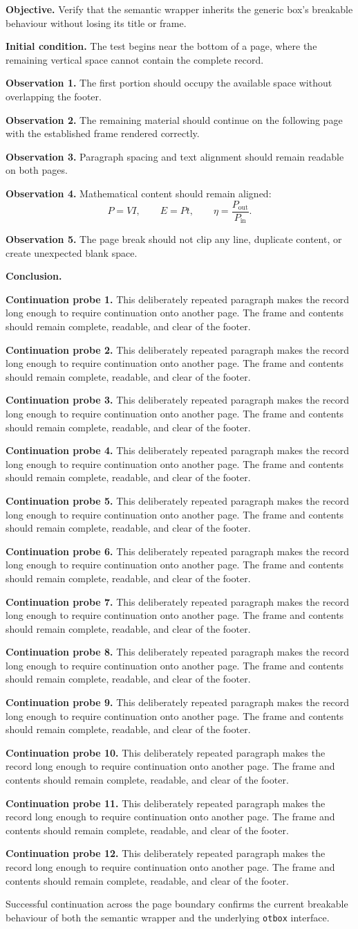 \documentclass{otengineering}
\newcommand{\breakprobe}[1]{%
    \par\medskip
    \textbf{Continuation probe #1.}
    This deliberately repeated paragraph makes the record long enough to
    require continuation onto another page. The frame and contents should
    remain complete, readable, and clear of the footer.
}
\begin{document}
\rule{0pt}{0.42\textheight}

\begin{experiment}
    \textbf{Objective.}
    Verify that the semantic wrapper inherits the generic box's breakable
    behaviour without losing its title or frame.

    \textbf{Initial condition.}
    The test begins near the bottom of a page, where the remaining vertical
    space cannot contain the complete record.

    \textbf{Observation 1.}
    The first portion should occupy the available space without overlapping
    the footer.

    \textbf{Observation 2.}
    The remaining material should continue on the following page with the
    established frame rendered correctly.

    \textbf{Observation 3.}
    Paragraph spacing and text alignment should remain readable on both
    pages.

    \textbf{Observation 4.}
    Mathematical content should remain aligned:
    \[
        P=VI,
        \qquad
        E=Pt,
        \qquad
        \eta=\frac{P_{\mathrm{out}}}{P_{\mathrm{in}}}.
    \]

    \textbf{Observation 5.}
    The page break should not clip any line, duplicate content, or create
    unexpected blank space.

    \textbf{Conclusion.}\breakprobe{1}
\breakprobe{2}
\breakprobe{3}
\breakprobe{4}
\breakprobe{5}
\breakprobe{6}
\breakprobe{7}
\breakprobe{8}
\breakprobe{9}
\breakprobe{10}
\breakprobe{11}
\breakprobe{12}
    Successful continuation across the page boundary confirms the current
    breakable behaviour of both the semantic wrapper and the underlying
    \texttt{otbox} interface.
\end{experiment}
\end{document}
